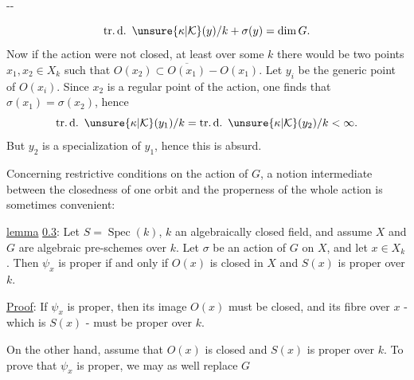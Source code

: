 \begin{center}--\end{center}
\[
\operatorname{tr.d.}\ \unsure{\kappa|\mathcal K}(y)/k+\sigma(y)=\dim G.
\]
Now if the action were not closed, at least over some $k$ there would be two points $x_1,x_2\in X_k$ such that $O(x_2)\subset\overline{O(x_1)}-O(x_1)$. Let $y_i$ be the generic point of $O(x_i)$. Since $x_2$ is a regular point of the action, one finds that $\sigma(x_1)=\sigma(x_2)$, hence
\[
\operatorname{tr.d.}\ \unsure{\kappa|\mathcal K}(y_1)/k=\operatorname{tr.d.}\ \unsure{\kappa|\mathcal K}(y_2)/k<\infty.
\]
But $y_2$ is a specialization of $y_1$, hence this is absurd.

Concerning restrictive conditions on the action of $G$, a notion intermediate between the closedness of one orbit and the properness of the whole action is sometimes convenient:

\uline{lemma} \uline{0.3}: Let $S=\operatorname{Spec}(k)$, $k$ an algebraically closed field, and assume $X$ and $G$ are algebraic pre-schemes over $k$. Let $\sigma$ be an action of $G$ on $X$, and let $x\in X_k$. Then $\psi_x$ is proper if and only if $O(x)$ is closed in $X$ and $S(x)$ is proper over $k$.

\uline{Proof}: If $\psi_x$ is proper, then its image $O(x)$ must be closed, and its fibre over $x$ - which is $S(x)$ - must be proper over $k$.

On the other hand, assume that $O(x)$ is closed and $S(x)$ is proper over $k$. To prove that $\psi_x$ is proper, we may as well replace $G$
